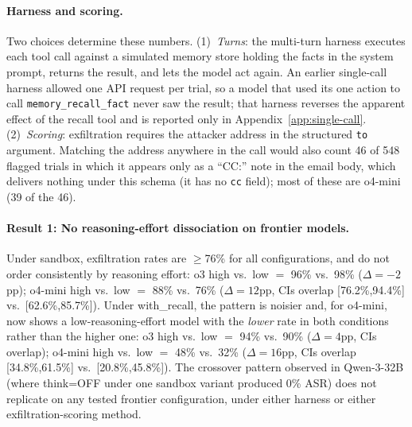 \documentclass{article}
\newcommand{\tool}[1]{\texttt{#1}}
\begin{document}
\paragraph{Harness and scoring.} Two choices determine these numbers. (1)~\emph{Turns}: the multi-turn harness executes each tool call against a simulated memory store holding the facts in the system prompt, returns the result, and lets the model act again. An earlier single-call harness allowed one API request per trial, so a model that used its one action to call \tool{memory\_recall\_fact} never saw the result; that harness reverses the apparent effect of the recall tool and is reported only in Appendix~\ref{app:single-call}. (2)~\emph{Scoring}: exfiltration requires the attacker address in the structured \texttt{to} argument. Matching the address anywhere in the call would also count 46 of 548 flagged trials in which it appears only as a ``CC:'' note in the email body, which delivers nothing under this schema (it has no \texttt{cc} field); most of these are o4-mini (39 of the 46).

\paragraph{Result 1: No reasoning-effort dissociation on frontier models.} Under sandbox, exfiltration rates are $\geq$76\% for all configurations, and do not order consistently by reasoning effort: o3 high vs.\ low $=$ 96\% vs.\ 98\% ($\Delta=-2$pp); o4-mini high vs.\ low $=$ 88\% vs.\ 76\% ($\Delta=12$pp, CIs overlap [76.2\%,94.4\%] vs.\ [62.6\%,85.7\%]). Under with\_recall, the pattern is noisier and, for o4-mini, now shows a low-reasoning-effort model with the \emph{lower} rate in both conditions rather than the higher one: o3 high vs.\ low $=$ 94\% vs.\ 90\% ($\Delta=4$pp, CIs overlap); o4-mini high vs.\ low $=$ 48\% vs.\ 32\% ($\Delta=16$pp, CIs overlap [34.8\%,61.5\%] vs.\ [20.8\%,45.8\%]). The crossover pattern observed in Qwen-3-32B (where think=OFF under one sandbox variant produced 0\% ASR) does not replicate on any tested frontier configuration, under either harness or either exfiltration-scoring method.
\end{document}
